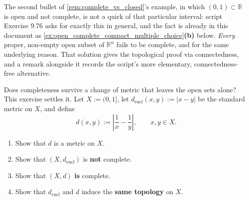 \begin{remark}
The second bullet of \cref{rem:complete_vs_closed}'s example, in which $(0,1) \subset \mathbb{R}$
is open and not complete, is not a quirk of that particular interval: script Exercise 9.76 asks
for exactly this in general, and the fact is already in this document as
\cref{ex:open_complete_compact_multiple_choice}\textbf{(b)} below. \emph{Every} proper, non-empty open subset of $\mathbb{R}^n$
fails to be complete, and for the same underlying reason. That solution gives the topological
proof via connectedness, and a remark alongside it records the script's more elementary,
connectedness-free alternative.
\end{remark}
\begin{exercise}
\label{ex:completeness_not_topological}
Does completeness survive a change of metric that leaves the open sets alone? This exercise
settles it. Let $X := (0,1]$, let $d_{\text{eucl}}(x,y) := |x-y|$ be
the standard metric on $X$, and define
\[d(x,y) := \left|\frac1x - \frac1y\right|, \qquad x,y \in X.\]
\begin{enumerate}[label=\textbf{(\alph*)}]
  \item Show that $d$ is a metric on $X$.
  \item Show that $(X,d_{\text{eucl}})$ is \textbf{not} complete.
  \item Show that $(X,d)$ \textbf{is} complete.
  \item Show that $d_{\text{eucl}}$ and $d$ induce the \textbf{same topology} on $X$.
\end{enumerate}
\end{exercise}


